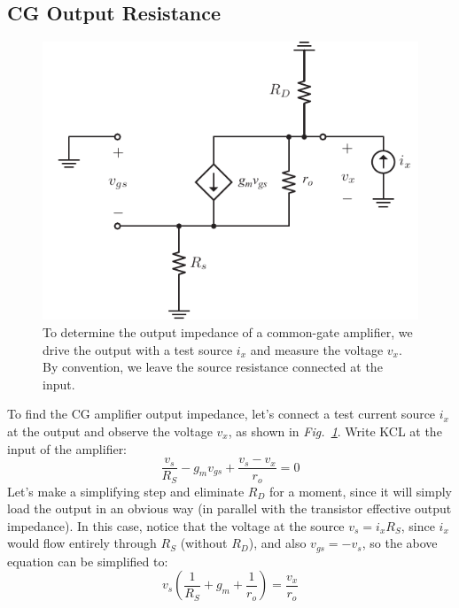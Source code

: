 \subsection{CG Output Resistance}
\begin{figure}[tb]
\centering
\includegraphics[scale=.9]{cgamp_is_ac_ss_rout}
\caption{To determine the output impedance of a common-gate amplifier, we drive the output with a test source $i_x$ and measure the voltage $v_x$.  By convention, we leave the source resistance connected at the input.}
\label{fig:cgamp_is_ac_ss_rout}
\end{figure}
To find the CG amplifier output impedance, let's connect a test current source $i_x$ at the output and observe the voltage $v_x$, as shown in \emph{Fig.~\ref{fig:cgamp_is_ac_ss_rout}}.  Write KCL at the input of the amplifier:
    \begin{equation}
        \frac{{{v_s}}}{{{R_S}}} - {g_m}{v_{gs}} + \frac{{{v_s} - {v_x}}}{{{r_o}}} = 0
    \end{equation}
Let's make a simplifying step and eliminate $R_D$ for a moment, since it will simply load the output in an obvious way (in parallel with the transistor effective output impedance).  In this case, notice that the voltage at the source $v_s = i_x R_S$, since $i_x$ would flow entirely through $R_S$ (without $R_D$), and also $v_{gs} = -v_s$, so the above equation can be simplified to:
    \begin{equation}
        {v_s}\left( {\frac{1}{{{R_S}}} + {g_m} + \frac{1}{{{r_o}}}} \right) = \frac{{{v_x}}}{{{r_o}}}
    \end{equation}
